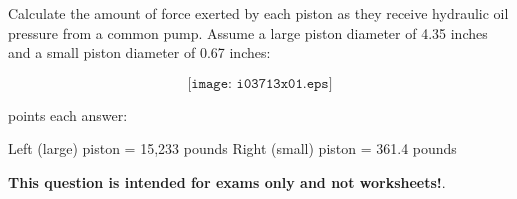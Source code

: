

Calculate the amount of force exerted by each piston as they receive hydraulic oil pressure from a common pump.   Assume a large piston diameter of 4.35 inches and a small piston diameter of 0.67 inches:

$$\texttt{[image: i03713x01.eps]}$$







 points each answer:

\vskip 10pt

Left (large) piston = 15,233 pounds \hskip 30pt Right (small) piston = 361.4 pounds







{\bf This question is intended for exams only and not worksheets!}.



